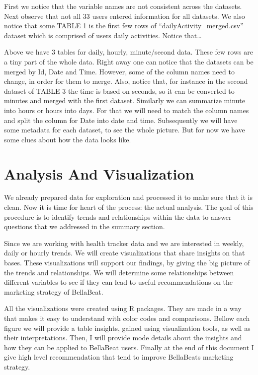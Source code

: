 \documentclass[
]{article}
\begin{document}
First we notice that the variable names are not consistent across the
datasets. Next observe that not all 33 users entered information for all
datasets. We also notice that some TABLE 1 is the first few rows of
``dailyActivity\_merged.csv'' dataset which is comprised of users daily
activities. Notice that\ldots{}

Above we have 3 tables for daily, hourly, minute/second data. These few
rows are a tiny part of the whole data. Right away one can notice that
the datasets can be merged by Id, Date and Time. However, some of the
column names need to change, in order for them to merge. Also, notice
that, for instance in the second dataset of TABLE 3 the time is based on
seconds, so it can be converted to minutes and merged with the first
dataset. Similarly we can summarize minute into hours or hours into
days. For that we will need to match the column names and split the
column for Date into date and time. Subsequently we will have some
metadata for each dataset, to see the whole picture. But for now we have
some clues about how the data looks like.

\hypertarget{analysis-and-visualization}{%
\section{Analysis And Visualization}\label{analysis-and-visualization}}

We already prepared data for exploration and processed it to make sure
that it is clean. Now it is time for heart of the process: the actual
analysis. The goal of this procedure is to identify trends and
relationships within the data to answer questions that we addressed in
the summary section.

Since we are working with health tracker data and we are interested in
weekly, daily or hourly trends. We will create visualizations that share
insights on that bases. These visualizations will support our findings,
by giving the big picture of the trends and relationships. We will
determine some relationships between different variables to see if they
can lead to useful recommendations on the marketing strategy of
BellaBeat.

All the visualizations were created using R packages. They are made in a
way that makes it easy to understand with color codes and comparisons.
Bellow each figure we will provide a table insights, gained using
visualization tools, as well as their interpretations. Then, I will
provide mode details about the insights and how they can be applied to
BellaBeat users. Finally at the end of this document I give high level
recommendation that tend to improve BellaBeats marketing strategy.
\end{document}
